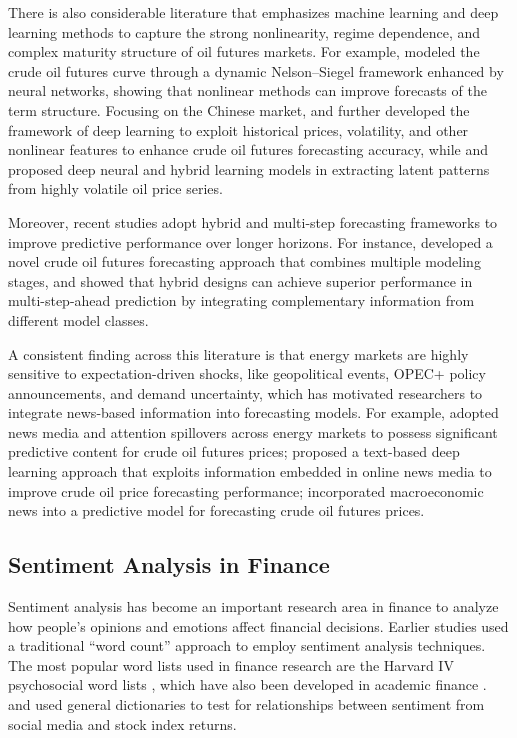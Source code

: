 \documentclass[preprint,12pt,authoryear]{elsarticle}
\begin{document}
There is also considerable literature that emphasizes machine learning and deep learning methods to capture the strong nonlinearity, regime dependence, and complex maturity structure of oil futures markets. For example, \citet{barunik2016forecasting} modeled the crude oil futures curve through a dynamic Nelson–Siegel framework enhanced by neural networks, showing that nonlinear methods can improve forecasts of the term structure. Focusing on the Chinese market, \citet{guo2023forecasting} and \citet{zhai2025research} further developed the framework of deep learning to exploit historical prices, volatility, and other nonlinear features to enhance crude oil futures forecasting accuracy, while \citet{zhao2017deep} and \citet{guan2023new} proposed deep neural and hybrid learning models in extracting latent patterns from highly volatile oil price series.

Moreover, recent studies adopt hybrid and multi-step forecasting frameworks to improve predictive performance over longer horizons. For instance, \citet{duan2022novel} developed a novel crude oil futures forecasting approach that combines multiple modeling stages, and \citet{chen2018multi} showed that hybrid designs can achieve superior performance in multi-step-ahead prediction by integrating complementary information from different model classes.

A consistent finding across this literature is that energy markets are highly sensitive to expectation-driven shocks, like geopolitical events, OPEC+ policy announcements, and demand uncertainty, which has motivated researchers to integrate news-based information into forecasting models. For example, \citet{cepni2022news} adopted news media and attention spillovers across energy markets to possess significant predictive content for crude oil futures prices; \citet{li2019text} proposed a text-based deep learning approach that exploits information embedded in online news media to improve crude oil price forecasting performance; \citet{sadik2020forecasting} incorporated macroeconomic news into a predictive model for forecasting crude oil futures prices.

\subsection{Sentiment Analysis in Finance}
Sentiment analysis \citep{medhat2014sentiment} has become an important research area in finance to analyze how people's opinions and emotions affect financial decisions. Earlier studies used a traditional ``word count'' approach \citep{guo2016textual, loughran2016textual} to employ sentiment analysis techniques. The most popular word lists used in finance research are the Harvard IV psychosocial word lists \citep{kearney2014textual}, which have also been developed in academic finance \citep{tetlock_giving_2007,tetlock2008more,twedt2012reading}. \citet{bollen_twitter_2011} and \citet{siganos2017divergence} used general dictionaries to test for relationships between sentiment from social media and stock index returns.
\end{document}
